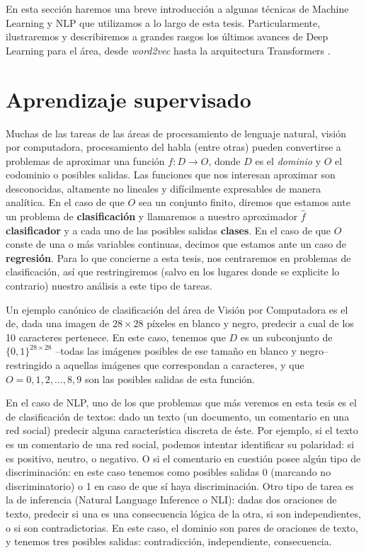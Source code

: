 En esta sección haremos una breve introducción a algunas técnicas de Machine Learning y NLP que utilizamos a lo largo de esta tesis. Particularmente, ilustraremos y describiremos a grandes rasgos los últimos avances de Deep Learning para el área, desde \emph{word2vec} \cite{mikolov2013distributed} hasta la arquitectura Transformers \cite{vaswani2017attention}.

\section{Aprendizaje supervisado}

Muchas de las tareas de las áreas de procesamiento de lenguaje natural, visión por computadora, procesamiento del habla (entre otras) pueden convertirse a problemas de aproximar una función $f: D \rightarrow O$, donde $D$ es el \emph{dominio} y $O$ el codominio o posibles salidas. Las funciones que nos interesan aproximar son desconocidas, altamente no lineales y difícilmente expresables de manera analítica. En el caso de que $O$ sea un conjunto finito, diremos que estamos ante un problema de \textbf{clasificación} y llamaremos a nuestro aproximador $\widehat{f}$ \textbf{clasificador} y a cada uno de las posibles salidas \textbf{clases}. En el caso de que $O$ conste de una o más variables continuas, decimos que estamos ante un caso de \textbf{regresión}. Para lo que concierne a esta tesis, nos centraremos en problemas de clasificación, así que restringiremos (salvo en los lugares donde se explicite lo contrario) nuestro análisis a este tipo de tareas.

Un ejemplo canónico de clasificación del área de Visión por Computadora es el de, dada una imagen de $28 \times 28$ píxeles en blanco y negro, predecir a cual de los 10 caracteres pertenece. En este caso, tenemos que $D$ es un subconjunto de $\{0, 1\}^{28 \times 28}$ --todas las imágenes posibles de ese tamaño en blanco y negro-- restringido a aquellas imágenes que correspondan a caracteres, y que $O = {0, 1, 2, \ldots, 8, 9}$ son las posibles salidas de esta función.

En el caso de NLP, uno de los que problemas que más veremos en esta tesis es el de clasificación de textos: dado un texto (un documento, un comentario en una red social) predecir alguna característica discreta de éste. Por ejemplo, si el texto es un comentario de una red social, podemos intentar identificar su polaridad: si es positivo, neutro, o negativo. O si el comentario en cuestión posee algún tipo de discriminación: en este caso tenemos como posibles salidas 0 (marcando no discriminatorio) o 1 en caso de que sí haya discriminación. Otro tipo de tarea es la de inferencia (Natural Language Inference o NLI): dadas dos oraciones de texto, predecir si una es una consecuencia lógica de la otra, si son independientes, o si son contradictorias. En este caso, el dominio son pares de oraciones de texto, y tenemos tres posibles salidas: contradicción, independiente, consecuencia.

